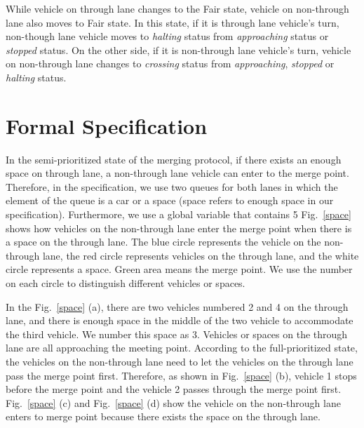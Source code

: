 \documentclass[10pt, conference, compsocconf]{IEEEtran}
\begin{document}
While vehicle on through lane changes to the Fair state, vehicle on non-through lane also moves to Fair state. 
In this state, if it is through lane vehicle's turn, non-though lane vehicle moves to \textit{halting} status from \textit{approaching} status or \textit{stopped} status. 
On the other side, if it is non-through lane vehicle's turn, vehicle on non-through lane changes to \textit{crossing} status from \textit{approaching}, \textit{stopped} or \textit{halting} status. 
 


 
\section{Formal Specification}
 \label{sect_formal}
 In the semi-prioritized state of the merging protocol, if there exists an enough space on through lane, a non-through lane vehicle can enter to the merge point.
 Therefore, in the specification, we use two queues for both lanes in which the element of the queue is a car or a space (space refers to enough space in our specification).
 Furthermore, we use a global variable that contains 5
 Fig.~\ref{space} shows how vehicles on the non-through lane enter the merge point when there is a space on the through lane. 
 The blue circle represents the vehicle on the non-through lane, the red circle represents vehicles on the through lane, and the white circle represents a space. 
 Green area means the merge point.
We use the number on each circle to distinguish different vehicles or spaces.

In the Fig.~\ref{space} (a), there are two vehicles numbered 2 and 4 on the through lane, and there is enough space in the middle of the two vehicle to accommodate the third vehicle. We number this space as 3.
Vehicles or spaces on the through lane are all approaching the meeting point.
According to the full-prioritized state, the vehicles on the non-through lane need to let the vehicles on the through lane pass the merge point first. 
Therefore, as shown in Fig.~\ref{space} (b), vehicle 1 stops before the merge point and the vehicle 2 passes through the merge point first.
Fig.~\ref{space} (c) and Fig.~\ref{space} (d) show the vehicle on the non-through lane enters to merge point because there exists the space on the through lane.
\end{document}

